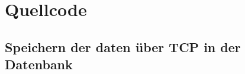 \chapter{Quellcode}
\label{quellcode}

\section{Speichern der daten über TCP in der Datenbank}
\label{save_data_tcp_code_gru}











